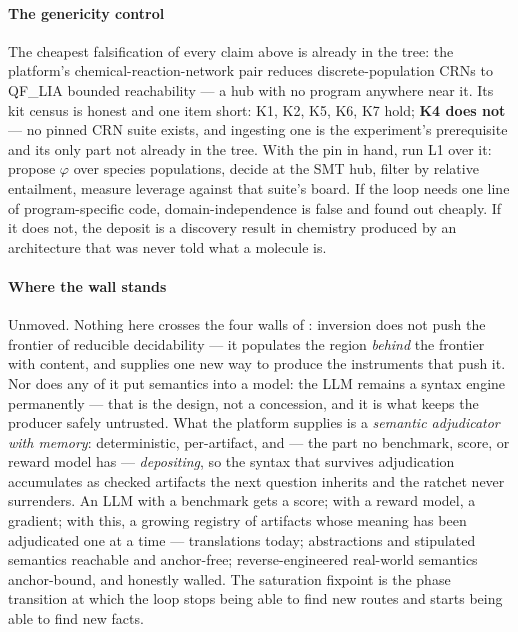 \paragraph{The genericity control}
The cheapest falsification of every claim above is already in the
tree: the platform's chemical-reaction-network pair reduces
discrete-population CRNs to \textsf{QF\_LIA} bounded reachability
--- a hub with no program anywhere near it. Its kit census is honest
and one item short: K1, K2, K5, K6, K7 hold; \textbf{K4 does not}
--- no pinned CRN suite exists, and ingesting one is the
experiment's prerequisite and its only part not already in the tree.
With the pin in hand, run L1 over it: propose $\varphi$ over species
populations, decide at the SMT hub, filter by relative entailment,
measure leverage against that suite's board. If the loop needs one
line of program-specific code, domain-independence is false and
found out cheaply. If it does not, the deposit is a discovery result
in chemistry produced by an architecture that was never told what a
molecule is.

\paragraph{Where the wall stands}
Unmoved. Nothing here crosses the four walls of
: inversion does not push the frontier of
reducible decidability --- it populates the region \emph{behind} the
frontier with content, and supplies one new way to produce the
instruments that push it. Nor does any of it put semantics into a
model: the LLM remains a syntax engine permanently --- that is the
design, not a concession, and it is what keeps the producer safely
untrusted. What the platform supplies is a \emph{semantic
adjudicator with memory}: deterministic, per-artifact, and ---
the part no benchmark, score, or reward model has ---
\emph{depositing}, so the syntax that survives adjudication
accumulates as checked artifacts the next question inherits and the
ratchet never surrenders. An LLM with a benchmark gets a score; with
a reward model, a gradient; with this, a growing registry of
artifacts whose meaning has been adjudicated one at a time ---
translations today; abstractions and stipulated semantics reachable
and anchor-free; reverse-engineered real-world semantics
anchor-bound, and honestly walled. The saturation fixpoint is the
phase transition at which the loop stops being able to find new
routes and starts being able to find new facts.
